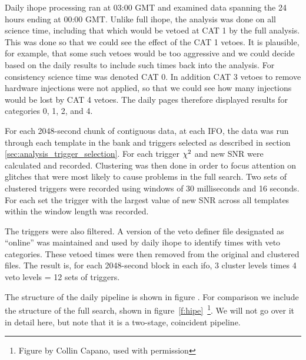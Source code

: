 Daily ihope processing ran at 03:00 GMT and examined data spanning the
24 hours ending at 00:00 GMT.  Unlike full ihope, the analysis was
done on all science time, including that which would be vetoed at CAT
1 by the full analysis.  This was done so that we could see the effect
of the CAT 1 vetoes.  It is plausible, for example, that some such
vetoes would be too aggressive and we could decide based on the daily
results to include such times back into the analysis.  For consistency
science time was denoted CAT 0.  In addition CAT 3 vetoes to remove
hardware injections were not applied, so that we could see how many
injections would be lost by CAT 4 vetoes.  The daily pages therefore
displayed results for categories 0, 1, 2, and 4.

For each 2048-second chunk of contiguous data, at each IFO, the data
was run through each template in the bank and triggers selected as
described in section \ref{sec:analysis_trigger_selection}. For each
trigger $\chi^2$ and new SNR were calculated and recorded.  Clustering
was then done in order to focus attention on glitches that were most
likely to cause problems in the full search.  Two sets of clustered
triggers were recorded using windows of 30 milliseconds and 16
seconds.  For each set the trigger with the largest value of new SNR
across all templates within the window length was recorded.

The triggers were also filtered.  A version of the veto definer file
designated as ``online'' was maintained and used by daily ihope to
identify times with veto categories.  These vetoed times were then
removed from the original and clustered files.  
The result is, for each 2048-second block in each ifo, 3 cluster
levels times 4 veto levels = 12 sets of triggers.

The structure of the daily pipeline is shown in figure .  For comparison we include the structure of the full search,
shown in figure~\ref{f:hipe}~\footnote{Figure by Collin Capano, used
with permission}.  We will not go over it in detail here, but note
that it is a two-stage, coincident pipeline.

